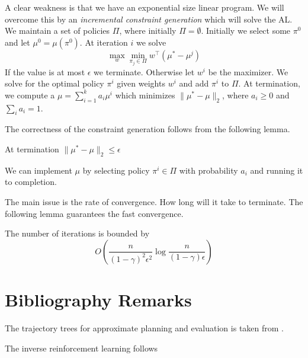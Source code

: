 A clear weakness is that we have an exponential size linear program.
We will overcome this by an {\em incremental constraint generation}
which will solve the AL. We maintain a set of policies $\Pi$, where
initially $\Pi=\emptyset$. Initially we select some $\pi^0$ and let
$\mu^0=\mu(\pi^0)$. At iteration $i$ we solve
\[
\max_w \min_{\pi_j\in \Pi} w^\top (\mu^*-\mu^j)
\]
If the value is at most $\epsilon$ we terminate. Otherwise let $w^i$
be the maximizer. We solve for the optimal policy $\pi^i$ given
weights $w^i$ and add $\pi^i$ to $\Pi$. At termination, we compute a
$\mu=\sum_{i=1}^k a_i\mu^i$ which minimizes $\|\mu^*-\mu\|_2$, where
$a_i\geq 0$ and $\sum_i a_i=1$.

The correctness of the constraint generation follows from the
following lemma.
\begin{lemma}
At termination $\|\mu^*-\mu\|_2\leq \epsilon$
\end{lemma}
We can implement $\mu$ by selecting policy $\pi^i\in\Pi$  with
probability $a_i$ and running it to completion.

The main issue is the rate of convergence. How long will it take to
terminate. The following lemma guarantees the fast convergence.
\begin{lemma}
The number of iterations is bounded by
\[
O(\frac{n}{(1-\gamma)^2\epsilon^2}\log\frac{n}{(1-\gamma)\epsilon})
\]
\end{lemma}
\section{Bibliography Remarks}

The trajectory trees for approximate planning and evaluation is
taken from \cite{KearnsMN99,KearnsMN02}.

The inverse reinforcement learning follows \cite{PieterN04,NgR00}


%
%
